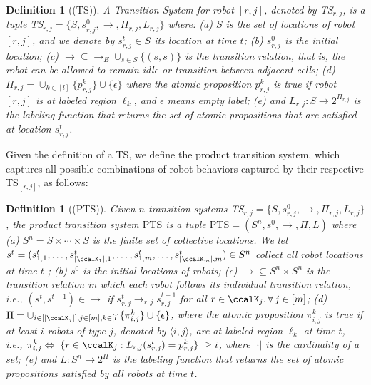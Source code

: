 \documentclass[Afour,sageh,times]{sagej}
\newtheorem{defn}[thm]{Definition}
\newcommand{\ag}[2]{\langle#1,#2\rangle}
\renewcommand{\ap}[3]{\mathcal{\pi}_{{#1},{#2}}^{#3}}
\begin{document}
\begin{defn}[(TS)]\label{def:ts}
  A { Transition System} for robot $[r,j]$, denoted by TS$_{r,j}$, is a tuple TS$_{r,j} = \{S, s_{r,j}^0, \to, \Pi_{r,j}, L_{r,j}\}$ where: (a) $S$ is the set of locations of robot $[r,j]$, and we denote by $s_{r,j}^t \in S$ its location at time $t$; (b) $s_{r,j}^0$ is the initial location; (c) $\to \subseteq \to_{E} \cup_{s\in S} \{(s,s)\} $ is the transition relation, that is, the robot can be allowed to remain idle or transition between adjacent cells; (d) $\Pi_{r,j} = \cup_{k\in [l]}\{p_{r,j}^k\} \cup \{\epsilon\}$ where the atomic proposition $p_{r,j}^{k}$ is true if robot $[r,j]$ is at labeled region $\ell_k$, and $\epsilon$ means empty label; (e) and $L_{r,j}: S \to 2^{\Pi_{r,j}} $ is the labeling function that returns the set of atomic propositions that are satisfied at location $s_{r,j}^t$.
\end{defn}

Given the definition of a TS, we define the {product transition system}, which captures all possible combinations of robot behaviors captured by their respective TS$_{[r,j]}$, as follows:
\begin{defn}[(PTS)]\label{def:pts}
  Given $n$ transition systems TS$_{r,j} = \{S, s_{r,j}^0, \to, \Pi_{r,j}, L_{r,j}\}$, the product transition system $\text{PTS}$ is a tuple $\text{PTS} = (S^n, s^0, \to, \Pi, L)$ where (a) $S^n = S\times \cdots \times S$ is the finite set of collective locations. We let $s^t = (s_{1,1}^t, \ldots, s_{|\ccalK_1|,1}^t, \ldots, s_{1,m}^t, \ldots, s_{|\ccalK_m|, m}^t) \in S^n$ collect all robot locations at time $t$%
  ; (b) $s^0$ is the initial locations of robots; (c) $\to \subseteq S^n \times S^n$ is the transition relation in which each robot follows its individual transition relation, i.e., $(s^t, s^{t+1}) \in \to$ if $s^t_{r,j}\rightarrow_{r,j} s^{t+1}_{r,j}$ for all $r\in \ccalK_j, \forall \,j \in [m]$;
  (d) $\Pi = \cup_{i\in[|\ccalK_j|], j\in [m], k\in [l]}\{\pi_{i,j}^k\} \cup \{\epsilon\}$, where the atomic proposition $\ap{i}{j}{k}$ is true if at least $i$ robots of type $j$, denoted by $\ag{i}{j}$, are at labeled region $\ell_k$ at time $t$, i.e., $\ap{i}{j}{k} \Leftrightarrow |\{r\in \ccalK_j: L_{r,j}(s_{r,j}^t) = p_{r,j}^k \}| \geq i$, where $|\cdot|$ is the cardinality of a set; (e) and $L: S^n \to 2^{\Pi}$ is the labeling function that returns the set of atomic propositions satisfied by all robots at time $t$.
\end{defn}
\end{document}
